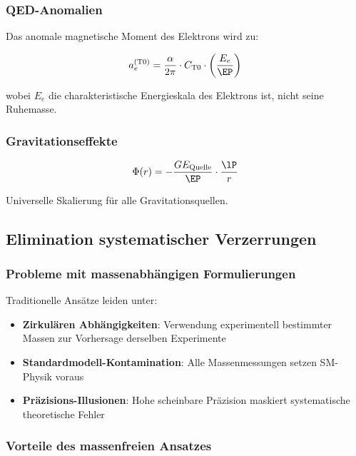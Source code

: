 	\subsubsection{QED-Anomalien}
	
	Das anomale magnetische Moment des Elektrons wird zu:
	
	\begin{equation}
		a_e^{(\text{T0})} = \frac{\alpha}{2\pi} \cdot C_{\text{T0}} \cdot \left(\frac{E_e}{\EP}\right)
		\label{eq:qed_universal}
	\end{equation}
	
	wobei $E_e$ die charakteristische Energieskala des Elektrons ist, nicht seine Ruhemasse.
	
	\subsubsection{Gravitationseffekte}
	
	\begin{equation}
		\Phi(r) = -\frac{G E_{\text{Quelle}}}{\EP} \cdot \frac{\lP}{r}
		\label{eq:gravity_universal}
	\end{equation}
	
	Universelle Skalierung für alle Gravitationsquellen.
	
	\subsection{Elimination systematischer Verzerrungen}
	\label{subsec:bias_elimination}
	
	\subsubsection{Probleme mit massenabhängigen Formulierungen}
	
	Traditionelle Ansätze leiden unter:
	\begin{itemize}
		\item \textbf{Zirkulären Abhängigkeiten}: Verwendung experimentell bestimmter Massen zur Vorhersage derselben Experimente
		\item \textbf{Standardmodell-Kontamination}: Alle Massenmessungen setzen SM-Physik voraus
		\item \textbf{Präzisions-Illusionen}: Hohe scheinbare Präzision maskiert systematische theoretische Fehler
	\end{itemize}
	
	\subsubsection{Vorteile des massenfreien Ansatzes}
	
